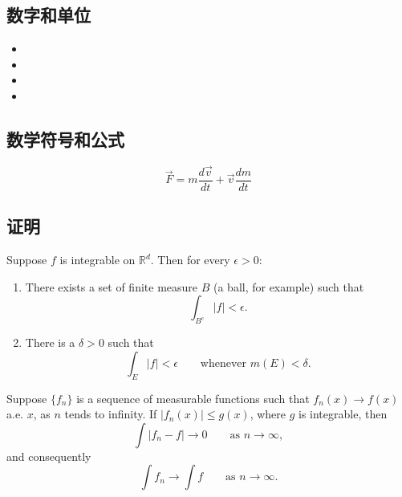 \subsection{数字和单位}

\begin{itemize}
    \item \unit{\mu}
    \item \unit{\eta}
    \item \unit{\lambda}
    \item \unit{\xi}
\end{itemize}

\subsection{数学符号和公式}

\begin{equation}
    \vec{F}=m\frac{d\vec{v}}{dt}+\vec{v}\frac{dm}{dt}
\end{equation}

\subsection{证明}
\begin{proposition}
    Suppose $f$ is integrable on $\mathbb{R}^d$. Then for every $\epsilon > 0$:
    \begin{enumerate}
        \renewcommand{\theenumi}{\roman{enumi}}
        \item There exists a set of finite measure $B$ (a ball, for example) such
              that
              \begin{equation}
                  \int_{B^c} |f| < \epsilon.
              \end{equation}
        \item There is a $\delta > 0$ such that
              \begin{equation}
                  \int_E |f| < \epsilon \qquad \text{whenever } m(E) < \delta.
              \end{equation}
    \end{enumerate}
\end{proposition}
\begin{theorem}
    Suppose $\{f_n\}$ is a sequence of measurable functions such that
    $f_n(x) \to f(x)$ a.e. $x$, as $n$ tends to infinity.
    If $|f_n(x)| \le g(x)$, where $g$ is integrable, then
    \begin{equation}
        \int |f_n - f| \to 0 \qquad \text{as } n \to \infty,
    \end{equation}
    and consequently
    \begin{equation}
        \int f_n \to \int f \qquad \text{as } n \to \infty.
    \end{equation}
\end{theorem}